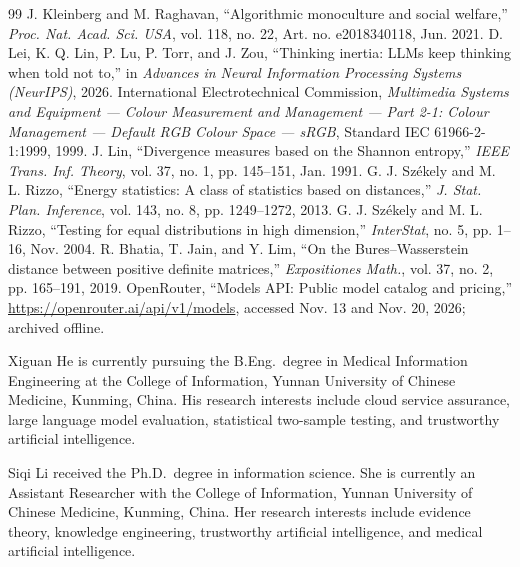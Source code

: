 \documentclass[10pt,journal,compsoc]{IEEEtran}
\begin{document}
\begin{thebibliography}{99}
 J. Kleinberg and M. Raghavan, ``Algorithmic monoculture and social welfare,'' \emph{Proc. Nat. Acad. Sci. USA}, vol. 118, no. 22, Art. no. e2018340118, Jun. 2021.
 D. Lei, K. Q. Lin, P. Lu, P. Torr, and J. Zou, ``Thinking inertia: LLMs keep thinking when told not to,'' in \emph{Advances in Neural Information Processing Systems (NeurIPS)}, 2026.
 International Electrotechnical Commission, \emph{Multimedia Systems and Equipment --- Colour Measurement and Management --- Part 2-1: Colour Management --- Default RGB Colour Space --- sRGB}, Standard IEC 61966-2-1:1999, 1999.
 J. Lin, ``Divergence measures based on the Shannon entropy,'' \emph{IEEE Trans. Inf. Theory}, vol. 37, no. 1, pp. 145--151, Jan. 1991.
 G. J. Sz\'{e}kely and M. L. Rizzo, ``Energy statistics: A class of statistics based on distances,'' \emph{J. Stat. Plan. Inference}, vol. 143, no. 8, pp. 1249--1272, 2013.
 G. J. Sz\'{e}kely and M. L. Rizzo, ``Testing for equal distributions in high dimension,'' \emph{InterStat}, no. 5, pp. 1--16, Nov. 2004.
 R. Bhatia, T. Jain, and Y. Lim, ``On the Bures--Wasserstein distance between positive definite matrices,'' \emph{Expositiones Math.}, vol. 37, no. 2, pp. 165--191, 2019.
 OpenRouter, ``Models API: Public model catalog and pricing,'' \url{https://openrouter.ai/api/v1/models}, accessed Nov. 13 and Nov. 20, 2026; archived offline.
\end{thebibliography}

\vfill
\begin{IEEEbiographynophoto}{Xiguan He}
is currently pursuing the B.Eng.\ degree in Medical Information Engineering at the College of Information, Yunnan University of Chinese Medicine, Kunming, China. His research interests include cloud service assurance, large language model evaluation, statistical two-sample testing, and trustworthy artificial intelligence.
\end{IEEEbiographynophoto}

\begin{IEEEbiographynophoto}{Siqi Li}
received the Ph.D.\ degree in information science. She is currently an Assistant Researcher with the College of Information, Yunnan University of Chinese Medicine, Kunming, China. Her research interests include evidence theory, knowledge engineering, trustworthy artificial intelligence, and medical artificial intelligence.
\end{IEEEbiographynophoto}
\end{document}
